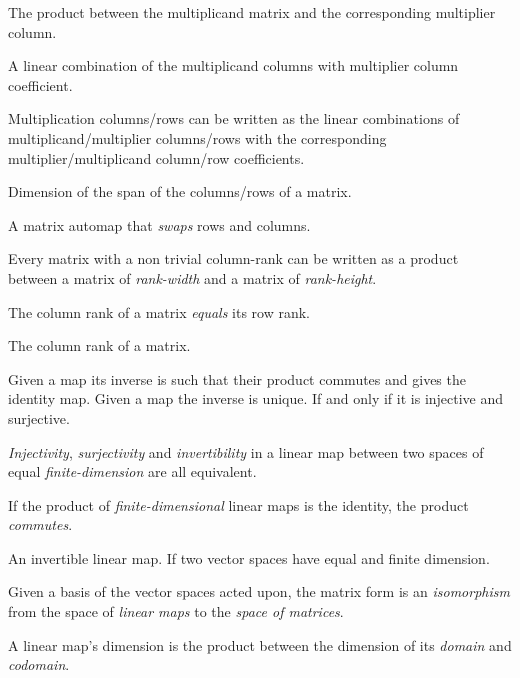 \begin{multicols}{3}
  The product between the multiplicand matrix and the corresponding multiplier column.

  A linear combination of the multiplicand columns with multiplier column coefficient.

  Multiplication columns/rows can be written as the linear combinations of
  multiplicand/multiplier columns/rows with
  the corresponding multiplier/multiplicand column/row coefficients.
  
  Dimension of the span of the columns/rows of a matrix.

  A matrix automap that \textit{swaps} rows and columns.

  Every matrix with a non trivial column-rank
  can be written as a product between
  a matrix of \textit{rank-width} and a matrix of \textit{rank-height}.

  The column rank of a matrix \textit{equals} its row rank.

  The column rank of a matrix.

  Given a map its inverse is such that their product commutes and gives the identity map.
  Given a map the inverse is unique.
  If and only if it is injective and surjective.

  \textit{Injectivity}, \textit{surjectivity} and \textit{invertibility} in a linear map between two spaces of equal \textit{finite-dimension} are all equivalent.

  If the product of \textit{finite-dimensional} linear maps is the identity, the product \textit{commutes}.

  An invertible linear map.
  If two vector spaces have equal and finite dimension.

  Given a basis of the vector spaces acted upon, the matrix form is an
  \textit{isomorphism} from the space of \textit{linear maps} to the \textit{space of matrices}.

  A linear map's dimension is the product between the dimension of its \textit{domain} and \textit{codomain}.


\end{multicols}
